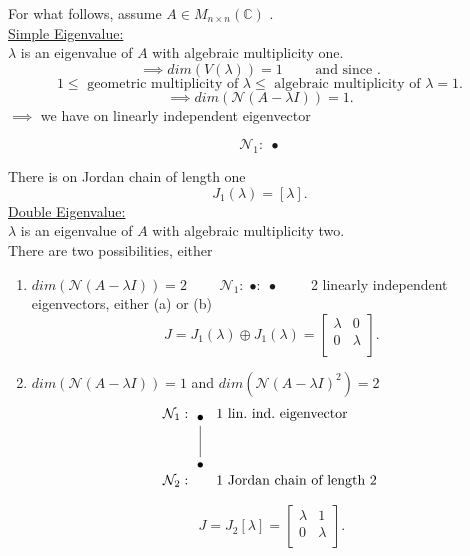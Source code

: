 \documentclass{report}
\begin{document}
   For what follows, assume $ A \in M _{ n \times  n} \left(  \mathbb{C} \right) $ .\\
   \underline{Simple Eigenvalue:} \\
   $ \lambda$ is an eigenvalue of $ A$ with algebraic multiplicity one.
   \[
   \implies dim \left(  V \left( \lambda \right)  \right) = 1 \qquad  \text{ and since }
   .\] 
   \[
   1 \leq \text{ geometric multiplicity of } \lambda \leq \text{ algebraic multiplicity of } \lambda = 1
   .\] 
   \[
   \implies dim \left( \mathcal{N} \left(  A - \lambda I \right)  \right) =1
   .\] 
   $ \implies$ we have on linearly independent eigenvector 

         \[
\mathcal{N}_1 :\; \bullet
\]




   There is on Jordan chain of length one
   \[
	   J_1 \left( \lambda \right) = \left[ \lambda \right] 
   .\] 
   \underline{Double Eigenvalue:} \\
   $ \lambda$ is an eigenvalue of $ A$ with algebraic multiplicity two.\\
   There are two possibilities, either 
   \begin{enumerate} [label=(\alph*)]
   \item $ dim \left( \mathcal{N} \left( A - \lambda I \right)  \right) =2 \qquad $   $
\mathcal{N}_1 :\; \bullet   :\; \bullet  \qquad  $ 2 linearly independent eigenvectors, either (a) or (b) 
\[
J = J_1 \left( \lambda \right) \oplus J_1 \left( \lambda \right) = \begin{bmatrix}
\lambda & 0\\
0 & \lambda\\
\end{bmatrix}
.\] 

   \item $ dim \left( \mathcal{N} \left( A - \lambda I \right)  \right) =1 $   and $ dim \left( \mathcal{N} \left(  A - \lambda I \right) ^2 \right) =2$ 
	         \[
\begin{array}{@{\;}l@{\;}c@{\;}l}
\mathcal{N}_1: &
\begin{tikzpicture}[baseline=(top)]
  \node (top) at (0,0)    {$\bullet$};
  \node (bot) at (0,-1.2) {$\bullet$};
  \draw (top) -- (bot);
\end{tikzpicture}
&\; 1 \text{ lin.\ ind.\ eigenvector}\\[1.8em]   %
 \mathcal{N}_2: & &\; 1 \text{ Jordan chain of length } 2
\end{array}
\]

    \[
	    J = J_2 \left[ \lambda \right]  = \begin{bmatrix}
	    \lambda & 1\\
	    0 & \lambda\\
	    \end{bmatrix}
    .\] 
   \end{enumerate}
\end{document}

